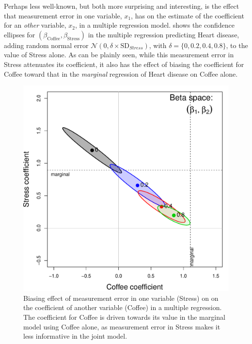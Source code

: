 Perhaps less well-known, but both more surprising and interesting, is the effect that measurement error in one variable,
$x_1$, 
has on the estimate of the coefficient for an \emph{other} variable, $x_2$, in a multiple regression model.
shows the confidence ellipses for $(\beta_{\textrm{Coffee}}, \beta_{\textrm{Stress}})$ in the multiple regression 
predicting Heart disease, adding random normal error
$\mathcal{N}(0, \delta \times \mathrm{SD}_{Stress})$, with $\delta = \{0, 0.2, 0.4, 0.8\}$, to the value of Stress
alone.  
As can be plainly seen, while this measurement error in Stress attenuates its coefficient,
it also has the effect of biasing the coefficient for Coffee toward that in the \emph{marginal}
regression of Heart disease on Coffee alone.


\begin{figure}[htb]
  \centering
  \includegraphics[width=.5\textwidth,clip]{fig/coffee-measerr}
  \caption{Biasing effect of measurement error in one variable (Stress) on on the coefficient of another variable
  (Coffee) in a multiple regression.  The coefficient for Coffee is driven towards its value in the marginal
  model using Coffee alone, as measurement error in Stress makes it less informative in the joint model.
  }%
  \label{fig:coffee-measerr}
\end{figure}



